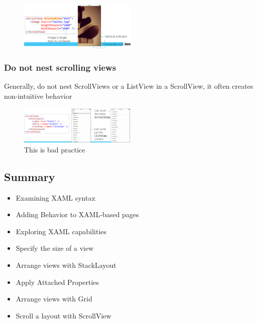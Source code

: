 \documentclass{article}
\begin{document}
\begin{figure}[H]
    \centering
    \includegraphics[width=0.5\textwidth]{xaml-scrollview-orientation.png}
    \caption{}
\end{figure}


\subsubsection{Do not nest scrolling views}

Generally, do not nest ScrollViews or a ListView in a ScrollView, it often
creates non-intuitive behavior

\begin{figure}[H]
    \centering
    \includegraphics[width=0.5\textwidth]{xaml-scrollview-nest.png}
    \caption{This is bad practice}
\end{figure}


\subsection{Summary}

\begin{itemize}
    \item Examining XAML syntax
    \item Adding Behavior to XAML-based pages
    \item Exploring XAML capabilities
    \item Specify the size of a view
    \item Arrange views with StackLayout
    \item Apply Attached Properties
    \item Arrange views with Grid
    \item Scroll a layout with ScrollView
\end{itemize}
\end{document}
